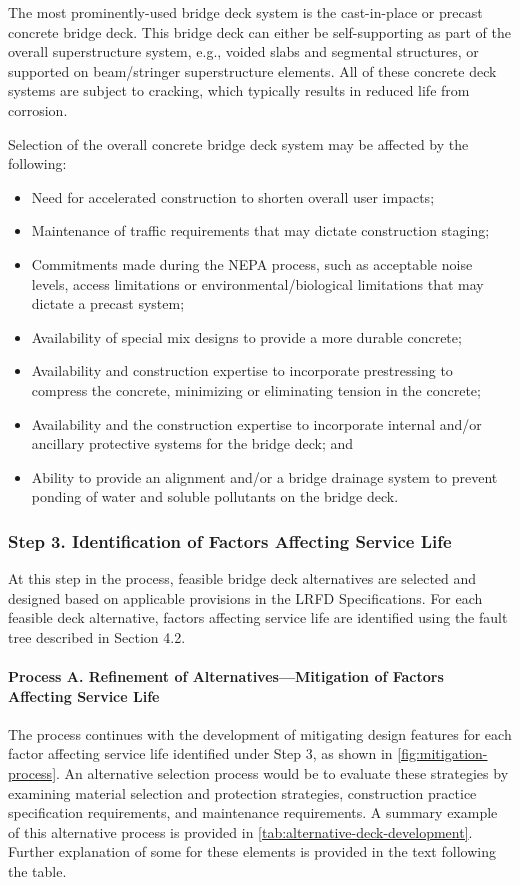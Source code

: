 The most prominently-used bridge deck system is the cast-in-place or precast concrete bridge deck. This bridge
deck can either be self-supporting as part of the overall superstructure system, e.g., voided slabs and segmental
structures, or supported on beam/stringer superstructure elements. All of these concrete deck systems are subject to
cracking, which typically results in reduced life from corrosion.

Selection of the overall concrete bridge deck system may be affected by the following:

\begin{itemize}
  \item Need for accelerated construction to shorten overall user impacts;
  \item Maintenance of traffic requirements that may dictate construction staging;
  \item Commitments made during the NEPA process, such as acceptable noise levels, access limitations or environmental/biological limitations that may dictate a precast system;
  \item Availability of special mix designs to provide a more durable concrete;
  \item Availability and construction expertise to incorporate prestressing to compress the concrete, minimizing or eliminating tension in the concrete;
  \item Availability and the construction expertise to incorporate internal and/or ancillary protective systems for the bridge deck; and
  \item Ability to provide an alignment and/or a bridge drainage system to prevent ponding of water and soluble pollutants on the bridge deck.
\end{itemize}

\subsubsection*{Step 3. Identification of Factors Affecting Service Life}
At this step in the process, feasible bridge deck alternatives are selected and designed based on applicable provisions in the LRFD Specifications. For each feasible deck alternative, factors affecting service life are identified using the fault tree described in Section 4.2.

\paragraph*{Process A. Refinement of Alternatives—Mitigation of Factors Affecting Service Life}
The process continues with the development of mitigating design features for each factor affecting service life identified under Step 3, as shown in \cref{fig:mitigation-process}. An alternative selection process would be to evaluate these strategies by examining material selection and protection strategies, construction practice specification requirements, and maintenance requirements. A summary example of this alternative process is provided in \cref{tab:alternative-deck-development}. Further explanation of some for these elements is provided in the text following the table.

